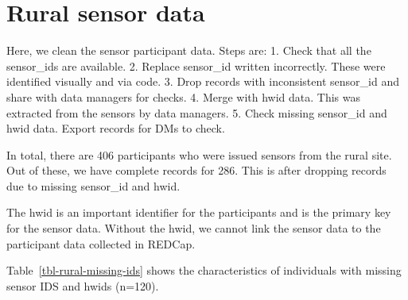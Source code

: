 \documentclass[
  letterpaper,
  DIV=11,
  numbers=noendperiod]{scrartcl}
\begin{document}
\hypertarget{rural-sensor-data}{%
\section{Rural sensor data}\label{rural-sensor-data}}

Here, we clean the sensor participant data. Steps are: 1. Check that all
the sensor\_ids are available. 2. Replace sensor\_id written
incorrectly. These were identified visually and via code. 3. Drop
records with inconsistent sensor\_id and share with data managers for
checks. 4. Merge with hwid data. This was extracted from the sensors by
data managers. 5. Check missing sensor\_id and hwid data. Export records
for DMs to check.

In total, there are 406 participants who were issued sensors from the
rural site. Out of these, we have complete records for 286. This is
after dropping records due to missing sensor\_id and hwid.

\begin{tcolorbox}[enhanced jigsaw, opacityback=0, arc=.35mm, rightrule=.15mm, coltitle=black, leftrule=.75mm, titlerule=0mm, breakable, toprule=.15mm, toptitle=1mm, title=\textcolor{quarto-callout-note-color}{\faInfo}\hspace{0.5em}{Note}, colframe=quarto-callout-note-color-frame, colbacktitle=quarto-callout-note-color!10!white, colback=white, bottomtitle=1mm, bottomrule=.15mm, opacitybacktitle=0.6, left=2mm]

The hwid is an important identifier for the participants and is the
primary key for the sensor data. Without the hwid, we cannot link the
sensor data to the participant data collected in REDCap.

\end{tcolorbox}

Table~\ref{tbl-rural-missing-ids} shows the characteristics of
individuals with missing sensor IDS and hwids (n=120).
\end{document}
